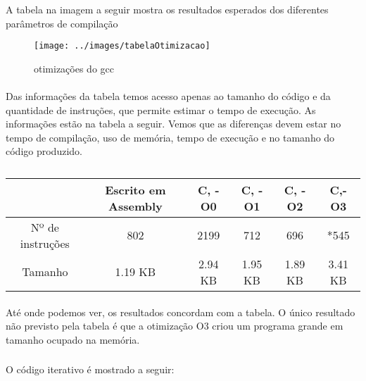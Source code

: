 \subsubsection{}
\paragraph{} A tabela na imagem a seguir mostra os resultados esperados dos diferentes
parâmetros de compilação
         \begin{figure}[H]
                 \centering
                 \texttt{[image: ../images/tabelaOtimizacao]}
                \caption{otimizações do gcc}
                 \label{fig:A2_2}
         \end{figure}


\paragraph{} Das informações da tabela temos acesso apenas ao tamanho do código e da quantidade de instruções, que permite estimar o tempo de execução. As informações estão na tabela a seguir. Vemos que as diferenças devem estar no tempo de compilação, uso de memória,
tempo de execução e no tamanho do código produzido.

\begin{table}[H]
	\centering 
	\begin{tabular}{|c|c|c|c|c|c|}\hline
&
Escrito em Assembly&
C, -O0&
C, -O1&
C, -O2&
C,-O3 \\ \hline
Nº de instruções &
802&
2199&
712&
696&
*545 \\ \hline
Tamanho &
1.19 KB&
2.94 KB&
1.95 KB&
1.89 KB&
3.41 KB \\ \hline
	\end{tabular}
	\caption{}
	\label{tab:}
\end{table}
\paragraph{} Até onde podemos ver, os resultados concordam com a tabela. O único resultado não previsto pela tabela é que a otimização O3 criou um programa grande em tamanho ocupado na memória.

\subsubsection{}
\paragraph{} O código iterativo é mostrado a seguir:
\begin{tiny}
    
\end{tiny}   

